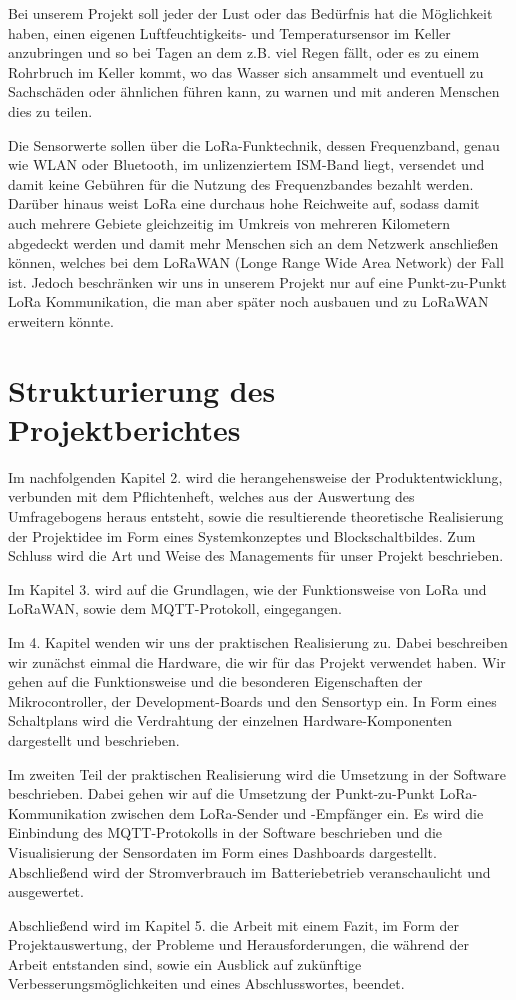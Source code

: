 Bei unserem Projekt soll jeder der Lust oder das Bedürfnis hat die Möglichkeit haben, einen eigenen Luftfeuchtigkeits- und Temperatursensor im Keller anzubringen und so bei Tagen an dem z.B. viel Regen fällt, oder es zu einem Rohrbruch im Keller kommt, wo das Wasser sich ansammelt und eventuell zu Sachschäden oder ähnlichen führen kann, zu warnen und mit anderen Menschen dies zu teilen.  

Die Sensorwerte sollen über die LoRa-Funktechnik, dessen Frequenzband, genau wie WLAN oder Bluetooth, im unlizenziertem ISM-Band liegt, versendet und damit keine Gebühren für die Nutzung des Frequenzbandes bezahlt werden. Darüber hinaus weist LoRa eine durchaus hohe Reichweite auf, sodass damit auch mehrere Gebiete gleichzeitig im Umkreis von mehreren Kilometern abgedeckt werden und damit mehr Menschen sich an dem Netzwerk anschließen können, welches bei dem LoRaWAN (Longe Range Wide Area Network) der Fall ist. Jedoch beschränken wir uns in unserem Projekt nur auf eine Punkt-zu-Punkt LoRa Kommunikation, die man aber später noch ausbauen und zu LoRaWAN erweitern könnte.  

\section{Strukturierung des Projektberichtes} \label{Strukturierung des Projektberichtes}

Im nachfolgenden Kapitel 2. wird die herangehensweise der Produktentwicklung, verbunden mit dem Pflichtenheft, welches aus der Auswertung des Umfragebogens heraus entsteht, sowie die resultierende theoretische Realisierung der Projektidee im Form eines Systemkonzeptes und Blockschaltbildes. Zum Schluss wird die Art und Weise des Managements für unser Projekt beschrieben. 

Im Kapitel 3. wird auf die Grundlagen, wie der Funktionsweise von LoRa und LoRaWAN, sowie dem MQTT-Protokoll, eingegangen.  

Im 4. Kapitel wenden wir uns der praktischen Realisierung zu. Dabei beschreiben wir zunächst einmal die Hardware, die wir für das Projekt verwendet haben. Wir gehen auf die Funktionsweise und die besonderen Eigenschaften der Mikrocontroller, der Development-Boards und den Sensortyp ein. In Form eines Schaltplans wird die Verdrahtung der einzelnen Hardware-Komponenten dargestellt und beschrieben.

Im zweiten Teil der praktischen Realisierung wird die Umsetzung in der Software beschrieben. Dabei gehen wir auf die Umsetzung der Punkt-zu-Punkt LoRa-Kommunikation zwischen dem LoRa-Sender und -Empfänger ein. Es wird die Einbindung des MQTT-Protokolls in der Software beschrieben und die Visualisierung der Sensordaten im Form eines Dashboards dargestellt. Abschließend wird der Stromverbrauch im Batteriebetrieb veranschaulicht und ausgewertet. 

Abschließend wird im Kapitel 5. die Arbeit mit einem Fazit, im Form der Projektauswertung, der Probleme und Herausforderungen, die während der Arbeit entstanden sind, sowie ein Ausblick auf zukünftige Verbesserungsmöglichkeiten und eines Abschlusswortes, beendet. 

